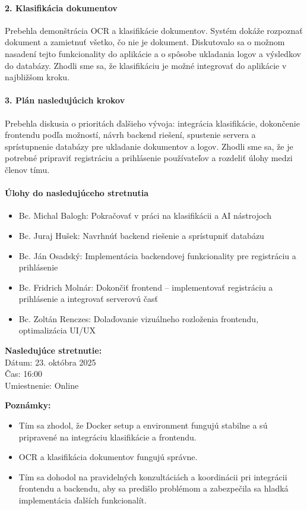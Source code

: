 \paragraph{2. Klasifikácia dokumentov}
Prebehla demonštrácia OCR a klasifikácie dokumentov. Systém dokáže rozpoznať dokument a zamietnuť všetko, čo nie je dokument. Diskutovalo sa o možnom nasadení tejto funkcionality do aplikácie a o spôsobe ukladania logov a výsledkov do databázy. Zhodli sme sa, že klasifikáciu je možné integrovať do aplikácie v najbližšom kroku.

\paragraph{3. Plán nasledujúcich krokov}
Prebehla diskusia o prioritách ďalšieho vývoja: integrácia klasifikácie, dokončenie frontendu podľa možností, návrh backend riešení, spustenie servera a sprístupnenie databázy pre ukladanie dokumentov a logov. Zhodli sme sa, že je potrebné pripraviť registráciu a prihlásenie používateľov a rozdeliť úlohy medzi členov tímu.

\paragraph{Úlohy do nasledujúceho stretnutia}
\begin{itemize}
    \item Bc. Michal Balogh: Pokračovať v práci na klasifikácii a AI nástrojoch
    \item Bc. Juraj Hušek: Navrhnúť backend riešenie a sprístupniť databázu
    \item Bc. Ján Osadský: Implementácia backendovej funkcionality pre registráciu a prihlásenie
    \item Bc. Fridrich Molnár: Dokončiť frontend – implementovať registráciu a prihlásenie a integrovať serverovú časť
    \item Bc. Zoltán Renczes: Dolaďovanie vizuálneho rozloženia frontendu, optimalizácia UI/UX
\end{itemize}

\vspace{0.5cm}
\textbf{Nasledujúce stretnutie:} \\
Dátum: 23. októbra 2025 \\
Čas: 16:00 \\
Umiestnenie: Online

\vspace{0.5cm}
\textbf{Poznámky:}
\begin{itemize}
    \item Tím sa zhodol, že Docker setup a environment fungujú stabilne a sú pripravené na integráciu klasifikácie a frontendu.
    \item OCR a klasifikácia dokumentov fungujú správne.
    \item Tím sa dohodol na pravidelných konzultáciách a koordinácii pri integrácii frontendu a backendu, aby sa predišlo problémom a zabezpečila sa hladká implementácia ďalších funkcionalít.
\end{itemize}
